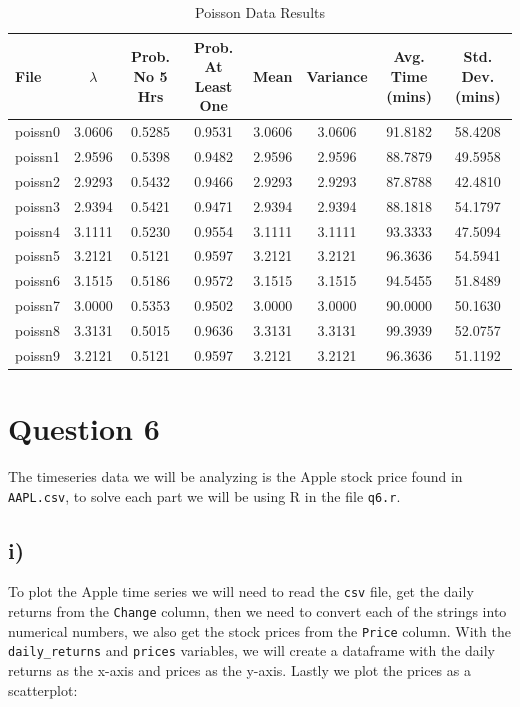 \documentclass[11pt, letterpaper]{article}
\begin{document}
\begin{table}[h]
	\centering
	\small
	\begin{tabular}{|l|c|c|c|c|c|c|c|}
		\hline
		File    & $\lambda$ & Prob. No 5 Hrs   & Prob. At Least One &
		Mean    & Variance  & Avg. Time (mins) & Std. Dev. (mins)
		\\
		\hline
		poissn0 & 3.0606    & 0.5285           & 0.9531             &
		3.0606  & 3.0606    & 91.8182
		        & 58.4208
		\\
		poissn1 & 2.9596    & 0.5398           & 0.9482             &
		2.9596  & 2.9596    & 88.7879
		        & 49.5958
		\\
		poissn2 & 2.9293    & 0.5432           & 0.9466             &
		2.9293  & 2.9293    & 87.8788
		        & 42.4810
		\\
		poissn3 & 2.9394    & 0.5421           & 0.9471             &
		2.9394  & 2.9394    & 88.1818
		        & 54.1797
		\\
		poissn4 & 3.1111    & 0.5230           & 0.9554             &
		3.1111  & 3.1111    & 93.3333
		        & 47.5094
		\\
		poissn5 & 3.2121    & 0.5121           & 0.9597             &
		3.2121  & 3.2121    & 96.3636
		        & 54.5941
		\\
		poissn6 & 3.1515    & 0.5186           & 0.9572             &
		3.1515  & 3.1515    & 94.5455
		        & 51.8489
		\\
		poissn7 & 3.0000    & 0.5353           & 0.9502             &
		3.0000  & 3.0000    & 90.0000
		        & 50.1630
		\\
		poissn8 & 3.3131    & 0.5015           & 0.9636             &
		3.3131  & 3.3131    & 99.3939
		        & 52.0757
		\\
		poissn9 & 3.2121    & 0.5121           & 0.9597             &
		3.2121  & 3.2121    & 96.3636
		        & 51.1192
		\\
		\hline
	\end{tabular}
	\caption{Poisson Data Results}
\end{table}

\section*{Question 6}
The timeseries data we will be analyzing is the Apple stock price found in
\verb|AAPL.csv|, to solve each
part we will be using R in the file \verb|q6.r|.
\subsection*{i)}
To plot the Apple time series we will need to read the \verb|csv| file, get the
daily returns from the \verb|Change| column,
then we need to convert each of the strings into numerical numbers, we also get
the stock prices from the \verb|Price| column.
With the \verb|daily_returns| and \verb|prices| variables, we will create a
dataframe with the daily returns as the x-axis
and prices as the y-axis. Lastly we plot the prices as a scatterplot:
\end{document}
